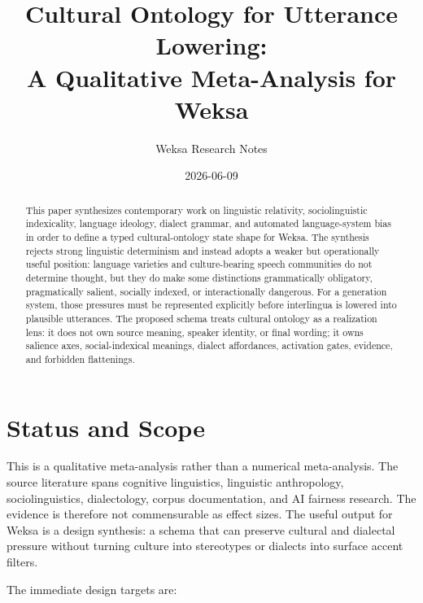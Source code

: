 \documentclass[11pt]{article}
\title{Cultural Ontology for Utterance Lowering:\\
A Qualitative Meta-Analysis for Weksa}
\author{Weksa Research Notes}
\date{2026-06-09}
\begin{document}
\maketitle

\begin{abstract}
This paper synthesizes contemporary work on linguistic relativity,
sociolinguistic indexicality, language ideology, dialect grammar, and automated
language-system bias in order to define a typed cultural-ontology state shape
for Weksa. The synthesis rejects strong linguistic determinism and instead
adopts a weaker but operationally useful position: language varieties and
culture-bearing speech communities do not determine thought, but they do make
some distinctions grammatically obligatory, pragmatically salient, socially
indexed, or interactionally dangerous. For a generation system, those pressures
must be represented explicitly before interlingua is lowered into plausible
utterances. The proposed schema treats cultural ontology as a realization lens:
it does not own source meaning, speaker identity, or final wording; it owns
salience axes, social-indexical meanings, dialect affordances, activation gates,
evidence, and forbidden flattenings.
\end{abstract}

\section{Status and Scope}

This is a qualitative meta-analysis rather than a numerical meta-analysis. The
source literature spans cognitive linguistics, linguistic anthropology,
sociolinguistics, dialectology, corpus documentation, and AI fairness research.
The evidence is therefore not commensurable as effect sizes. The useful output
for Weksa is a design synthesis: a schema that can preserve cultural and
dialectal pressure without turning culture into stereotypes or dialects into
surface accent filters.

The immediate design targets are:
\end{document}
